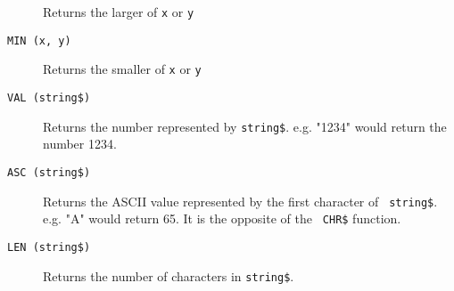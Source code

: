 \begin{description}
Returns the larger of {\tt x} or {\tt y}
\item[{\tt MIN (x, y)}]
Returns the smaller of {\tt x} or {\tt y}
\item[{\tt VAL (string\$)}]
Returns the number represented by {\tt string\$}. e.g. "1234" would
return the number 1234.
\item[{\tt ASC (string\$)}]
Returns the ASCII value represented by the first character of {\tt
string\$}. e.g. "A" would return 65. It is the opposite of the {\tt
CHR\$} function.
\item[{\tt LEN (string\$)}]
Returns the number of characters in {\tt string\$}.
\end{description}
